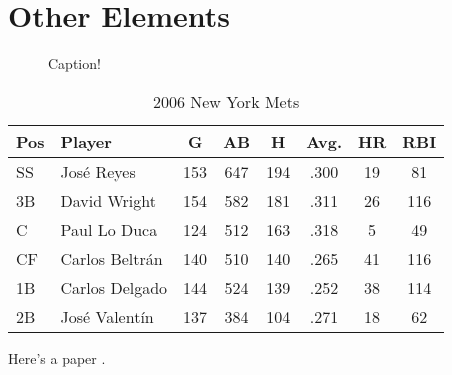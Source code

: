 \blinddocument
\chapter{Other Elements}
\begin{figure}
\caption[Caption that Goes in the List of Figures]{Caption!}
\end{figure}

\begin{table}
\begin{tabular}{ll|cccccc}
Pos & Player & G & AB & H & Avg. & HR & RBI \\
\hline
SS & José Reyes & 153 & 647 & 194 & .300 & 19 & 81 \\ 
3B & David Wright & 154 & 582 & 181 & .311 & 26 & 116 \\
C & Paul Lo Duca & 124 & 512 & 163 & .318 & 5 & 49 \\
CF & Carlos Beltrán & 140 & 510 & 140 & .265 & 41 & 116 \\
1B & Carlos Delgado & 144 & 524 & 139 & .252 & 38 & 114  \\
2B & José Valentín & 137 & 384 & 104 & .271 & 18 & 62 \\

\end{tabular}
\caption[Demo Table]{2006 New York Mets}
\end{table}

Here's a paper \cite{erdos1935combinatorial}.
